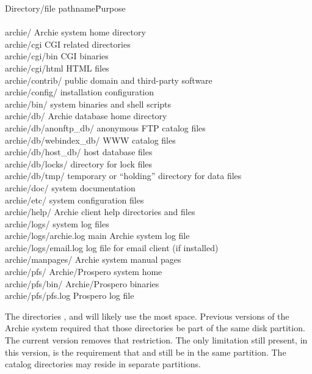 \begin{center}
\begin{tabbing}
Directory/file pathname\hspace*{5mm}\= Purpose \\
\\
archie/ \> Archie system home directory \\
archie/cgi \> CGI related directories \\
archie/cgi/bin \> CGI binaries \\
archie/cgi/html \> HTML files \\
archie/contrib/ \> public domain and third-party software \\
archie/config/ \> installation configuration \\
archie/bin/ \> system binaries and shell scripts \\
archie/db/ \> Archie database home directory \\
archie/db/anonftp\_db/ \> anonymous FTP catalog files \\
archie/db/webindex\_db/ \> WWW catalog files \\
archie/db/host\_db/ \> host database files \\
archie/db/locks/ \> directory for lock files \\
archie/db/tmp/ \> temporary or ``holding'' directory for data files \\
archie/doc/ \> system documentation \\
archie/etc/ \> system configuration files \\
archie/help/ \> Archie client help directories and files \\
archie/logs/ \> system log files \\
archie/logs/archie.log \> main Archie system log file \\
archie/logs/email.log \> log file for email client (if installed) \\
archie/manpages/ \> Archie system manual pages \\
archie/pfs/ \> Archie/Prospero system home \\
archie/pfs/bin/ \> Archie/Prospero binaries \\
archie/pfs/pfs.log \> Prospero log file  \\
\end{tabbing}
\end{center}

The directories ,  and
 will likely use the most space. Previous versions of
the Archie system required that those directories be part of the same disk
partition. The current version removes that restriction. \new The only
limitation still present, in this version, is the requirement that
  and 
 still be in the same partition. The catalog directories may reside in
separate partitions.



